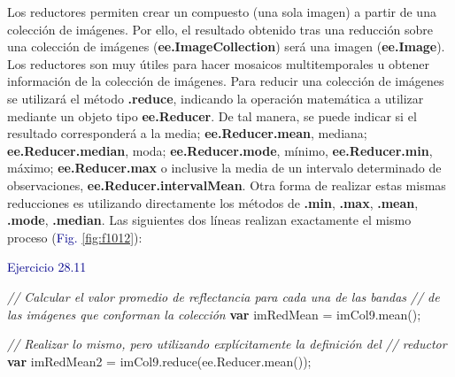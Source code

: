 \documentclass[
  12pt,
  letterpaper,
  twoside]{book}
\newenvironment{Shaded}{\begin{snugshade}}{\end{snugshade}}
\newcommand{\AttributeTok}[1]{\textcolor[rgb]{0.48,0.12,0.64}{#1}}
\newcommand{\CommentTok}[1]{\textcolor[rgb]{0.24,0.58,0.00}{\textit{#1}}}
\newcommand{\ControlFlowTok}[1]{\textcolor[rgb]{0.00,0.00,0.00}{\textbf{#1}}}
\newcommand{\FunctionTok}[1]{\textcolor[rgb]{0.48,0.12,0.64}{#1}}
\newcommand{\KeywordTok}[1]{\textcolor[rgb]{0.48,0.12,0.64}{#1}}
\newcommand{\NormalTok}[1]{#1}
\newcommand{\OperatorTok}[1]{\textcolor[rgb]{0.00,0.00,0.00}{#1}}
\newcommand\boldpurple[1]{\textcolor{darkpurple}{\textbf{#1}}}
\begin{document}
Los reductores permiten crear un compuesto (una sola imagen) a partir de una colección de imágenes. Por ello, el resultado obtenido tras una reducción sobre una colección de imágenes (\boldpurple{ee.ImageCollection}) será una imagen (\boldpurple{ee.Image}). Los reductores son muy útiles para hacer mosaicos multitemporales u obtener información de la colección de imágenes. Para reducir una colección de imágenes se utilizará el método \boldpurple{.reduce}, indicando la operación matemática a utilizar mediante un objeto tipo \boldpurple{ee.Reducer}. De tal manera, se puede indicar si el resultado corresponderá a la media; \boldpurple{ee.Reducer.mean}, mediana; \boldpurple{ee.Reducer.median}, moda; \boldpurple{ee.Reducer.mode}, mínimo, \boldpurple{ee.Reducer.min}, máximo; \boldpurple{ee.Reducer.max} o inclusive la media de un intervalo determinado de observaciones, \boldpurple{ee.Reducer.intervalMean}. Otra forma de realizar estas mismas reducciones es utilizando directamente los métodos de \boldpurple{.min}, \boldpurple{.max}, \boldpurple{.mean}, \boldpurple{.mode}, \boldpurple{.median}. Las siguientes dos líneas realizan exactamente el mismo proceso (\textcolor{darkblue}{Fig.} \ref{fig:f1012}):

\textcolor{darkblue}{Ejercicio 28.11}

\begin{Shaded}
\begin{Highlighting}[]
\CommentTok{// Calcular el valor promedio de reflectancia para cada una de las bandas }
\CommentTok{// de las imágenes que conforman la colección}
\ControlFlowTok{var}\NormalTok{ imRedMean }\OperatorTok{=}\NormalTok{ imCol9}\OperatorTok{.}\FunctionTok{mean}\NormalTok{()}\OperatorTok{;}

\CommentTok{// Realizar lo mismo, pero utilizando explícitamente la definición del }
\CommentTok{// reductor}
\ControlFlowTok{var}\NormalTok{ imRedMean2 }\OperatorTok{=}\NormalTok{ imCol9}\OperatorTok{.}\FunctionTok{reduce}\NormalTok{(}\KeywordTok{ee}\OperatorTok{.}\AttributeTok{Reducer}\OperatorTok{.}\FunctionTok{mean}\NormalTok{())}\OperatorTok{;}
\end{Highlighting}
\end{Shaded}
\end{document}
